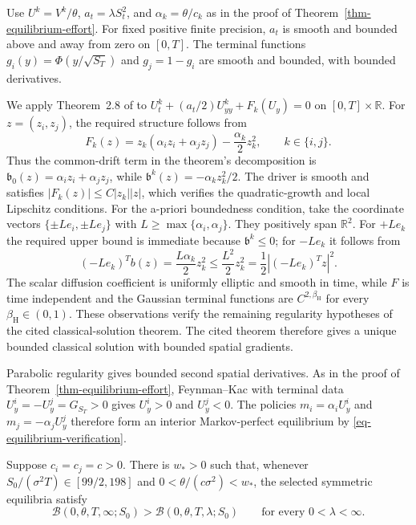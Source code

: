 \documentclass[mnsc]{informs3}
\begin{document}
\begin{APPENDICES}
{
Use $U^k=V^k/\theta$, $a_t=\lambda S_t^2$, and
$\alpha_k=\theta/c_k$ as in the proof of
Theorem~\ref{thm-equilibrium-effort}. For fixed positive finite precision,
$a_t$ is smooth and bounded above and away from zero on $[0,T]$.
The terminal functions $g_i(y)=\Phi(y/\sqrt{S_T})$ and $g_j=1-g_i$
are smooth and bounded, with bounded derivatives.

We apply Theorem~2.8 of \citet{Jackson2023Quadratic} to
$U_t^k+(a_t/2)U_{yy}^k+F_k(U_y)=0$ on $[0,T]\times\mathbb R$.
For $z=(z_i,z_j)$, the required structure follows from
\[
F_k(z)=z_k(\alpha_i z_i+\alpha_j z_j)
-\frac{\alpha_k}{2}z_k^2,\qquad k\in\{i,j\}.
\]
Thus the common-drift term in the theorem's decomposition is
$\mathfrak b_0(z)=\alpha_i z_i+\alpha_j z_j$, while
$\mathfrak b^k(z)=-\alpha_kz_k^2/2$. The driver is smooth and satisfies
$|F_k(z)|\leq C|z_k||z|$, which verifies the quadratic-growth and local
Lipschitz conditions. For the a-priori boundedness condition, take the
coordinate vectors $\{\pm L e_i,\pm L e_j\}$ with
$L\geq\max\{\alpha_i,\alpha_j\}$. They positively span $\mathbb R^2$.
For $+Le_k$ the required upper bound is immediate because $\mathfrak b^k\leq0$;
for $-Le_k$ it follows from
\[
(-Le_k)^Tb(z)=\frac{L\alpha_k}{2}z_k^2
\leq\frac{L^2}{2}z_k^2
=\frac12|(-Le_k)^Tz|^2.
\]
The scalar diffusion coefficient is uniformly elliptic and smooth in
time, while $F$ is time independent and the Gaussian terminal functions
are $C^{2,\beta_{\mathrm H}}$ for every $\beta_{\mathrm H}\in(0,1)$. These observations verify the
remaining regularity hypotheses of the cited classical-solution theorem.
The cited theorem therefore gives a unique bounded classical solution with
bounded spatial gradients.

Parabolic regularity gives bounded second spatial derivatives.
As in the proof of Theorem~\ref{thm-equilibrium-effort},
Feynman--Kac with terminal data $U_y^i=-U_y^j=G_{S_T}>0$ gives
$U_y^i>0$ and $U_y^j<0$. The policies $m_i=\alpha_iU_y^i$ and
$m_j=-\alpha_jU_y^j$ therefore form an interior Markov-perfect
equilibrium by \eqref{eq-equilibrium-verification}.
\Halmos
\endproof
}

{
\begin{lemma}\label{lem-design-weak-precision}
Suppose $c_i=c_j=c>0$. There is $w_*>0$ such that, whenever
$S_0/(\sigma^2T)\in[99/2,198]$ and $0<\theta/(c\sigma^2)<w_*$,
the selected symmetric equilibria satisfy
\begin{equation}\label{eq-design-uniform-weak-ranking}
\mathcal B(0,\theta,T,\infty;S_0)>
\mathcal B(0,\theta,T,\lambda;S_0)
\qquad\text{for every }0<\lambda<\infty.
\end{equation}
\end{lemma}

}
\end{APPENDICES}
\end{document}
